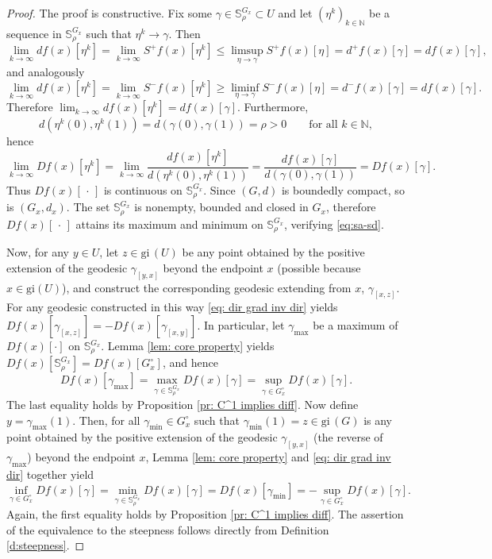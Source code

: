 \documentclass{article}
\theoremstyle{plain}\newtheorem{theorem}{Theorem}[section]
\theoremstyle{plain}\newtheorem{definition}[theorem]{Definition}
\theoremstyle{plain}\newtheorem{lemma}[theorem]{Lemma}
\theoremstyle{definition}\newtheorem{remark}[theorem]{Remark}
\theoremstyle{definition}\newtheorem{example}[theorem]{Example}
\theoremstyle{plain}\newtheorem{proposition}[theorem]{Proposition}
\theoremstyle{plain}\newtheorem{inference}[theorem]{Inference}
\theoremstyle{plain}\newtheorem{corollary}[theorem]{Corollary}
\theoremstyle{plain}\newtheorem{assumption}[theorem]{Assumption}
\newcommand{\bbN}{\mathbb{N}}
\begin{document}
\begin{proof}
    The proof is constructive. Fix some $\gamma\in\mathbb{S}^{G_x}_{\rho}\subset U$ and let $(\eta^k)_{k\in\bbN}$ be a sequence in $\mathbb{S}^{G_x}_{\rho}$ such that $\eta^k\to\gamma$. Then
    $$
    \lim_{k\to\infty}df(x)[\eta^k]=\lim_{k\to\infty}S^+f(x)[\eta^k]\leq\limsup_{\eta\to\gamma}S^+f(x)[\eta]=d^+f(x)[\gamma]=df(x)[\gamma],
    $$
    and analogously
    $$
    \lim_{k\to\infty}df(x)[\eta^k]=\lim_{k\to\infty}S^-f(x)[\eta^k]\geq\liminf_{\eta\to\gamma}S^-f(x)[\eta]=d^-f(x)[\gamma]=df(x)[\gamma].
    $$
    Therefore $\lim_{k\to\infty}df(x)[\eta^k]=df(x)[\gamma]$. Furthermore,
    $$
    d(\eta^k(0), \eta^k(1))=d(\gamma(0), \gamma(1))=\rho>0\qquad\text{for all}\,\,k\in\bbN,
    $$
    hence
    $$
    \lim_{k\to\infty}Df(x)[\eta^k]=\lim_{k\to\infty}\frac{df(x)[\eta^k]}{d(\eta^k(0), \eta^k(1))}=\frac{df(x)[\gamma]}{d(\gamma(0), \gamma(1))}=Df(x)[\gamma].
    $$
    Thus $Df(x)[\,\cdot\,]$ is continuous on $\mathbb{S}^{G_x}_{\rho}$. Since $(G,d)$ is boundedly compact, so is $(G_x,d_x)$. The set $\mathbb{S}^{G_x}_{\rho}$ is nonempty, bounded and closed in $G_x$, therefore $Df(x)[\,\cdot\,]$ attains its maximum and minimum on $\mathbb{S}^{G_x}_{\rho}$, verifying \eqref{eq:sa-sd}.

    Now, for any $y\in U$, let $z\in \mathrm{gi}\,(U)$ be any point obtained by the positive extension of the geodesic $\gamma_{[y,x]}$ beyond the endpoint $x$ (possible because $x\in \mathrm{gi}(U)$), and construct the corresponding geodesic extending from $x$, $\gamma_{[x,z]}$. For any geodesic constructed in this way \eqref{eq: dir grad inv dir} yields $Df(x)[\gamma_{[x,z]}]=-Df(x)[\gamma_{[x,y]}]$. In particular, let $\gamma_{\max}$ be a maximum of $Df(x)[\cdot]$ on $\mathbb{S}^{G_x}_{\rho}$. Lemma \ref{lem: core property} yields $Df(x)[\mathbb{S}^{G_x}_{\rho}]=Df(x)[G_x^{\circ}]$, and hence
    $$
    Df(x)[\gamma_{\max}]=\max_{\gamma\in \mathbb{S}^{G_x}_{\rho}}Df(x)[\gamma]=\sup_{\gamma\in G_x^\circ}Df(x)[\gamma].
    $$
    The last equality holds by Proposition \ref{pr: C^1 implies diff}. Now define $y=\gamma_{\max}(1)$. Then, for all $\gamma_{\min}\in G_x^\circ$ such that $\gamma_{\min}(1)=z\in\mathrm{gi}\,(G)$ is any point obtained by the positive extension of the geodesic $\gamma_{[y,x]}$ (the reverse of $\gamma_{\max}$) beyond the endpoint $x$, Lemma \ref{lem: core property} and \eqref{eq: dir grad inv dir} together yield
    $$
    \inf_{\gamma\in G_x^\circ}Df(x)[\gamma] = \min_{\gamma\in \mathbb{S}^{G_x}_{\rho}}Df(x)[\gamma] = Df(x)[\gamma_{\min}]=-\sup_{\gamma\in G_x^\circ}Df(x)[\gamma].
    $$
    Again, the first equality holds by Proposition \ref{pr: C^1 implies diff}. The assertion of the equivalence to the steepness follows directly from Definition \ref{d:steepness}.
\end{proof}
\end{document}
